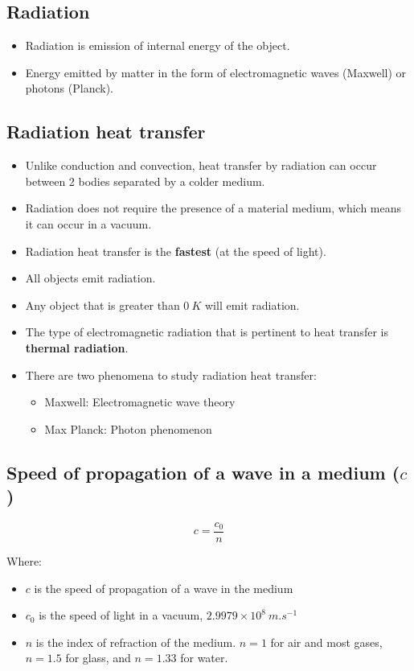 \documentclass[11pt]{article}
\begin{document}
\subsection{Radiation}
\label{sec:orgaef3ab9}
\begin{itemize}
\item Radiation is emission of internal energy of the object.
\item Energy emitted by matter in the form of electromagnetic waves (Maxwell) or photons (Planck).
\end{itemize}
\subsection{Radiation heat transfer}
\label{sec:org014d155}
\begin{itemize}
\item Unlike conduction and convection, heat transfer by radiation can occur between 2 bodies separated by a colder medium.
\item Radiation does not require the presence of a material medium, which means it can occur in a vacuum.
\item Radiation heat transfer is the \textbf{fastest} (at the speed of light).
\item All objects emit radiation.
\item Any object that is greater than \(\qty{0}{K}\) will emit radiation.
\item The type of electromagnetic radiation that is pertinent to heat transfer is \textbf{thermal radiation}.
\item There are two phenomena to study radiation heat transfer:
\begin{itemize}
\item Maxwell: Electromagnetic wave theory
\item Max Planck: Photon phenomenon
\end{itemize}
\end{itemize}
\subsection{Speed of propagation of a wave in a medium (\(c\))}
\label{sec:org10daa47}
\[c = \frac{c_0}{n}\]

Where:
\begin{itemize}
\item \(c\) is the speed of propagation of a wave in the medium
\item \(c_0\) is the speed of light in a vacuum, \(2.9979 \times 10^8 \ \unit{m.s^{-1}}\)
\item \(n\) is the index of refraction of the medium. \(n = 1\) for air and most gases, \(n = 1.5\) for glass, and \(n = 1.33\) for water.
\end{itemize}
\end{document}

